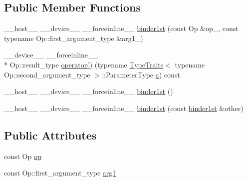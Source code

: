 \subsection*{Public Member Functions}
\begin{DoxyCompactItemize}
\item 
\-\_\-\-\_\-host\-\_\-\-\_\- \-\_\-\-\_\-device\-\_\-\-\_\- \-\_\-\-\_\-forceinline\-\_\-\-\_\- \hyperlink{structcv_1_1gpu_1_1device_1_1binder1st_a2bada5a6b0c80f382fd73dc3eeb9465f}{binder1st} (const Op \&op\-\_\-, const typename Op\-::first\-\_\-argument\-\_\-type \&arg1\-\_\-)
\item 
\-\_\-\-\_\-device\-\_\-\-\_\- \-\_\-\-\_\-forceinline\-\_\-\-\_\- \\*
Op\-::result\-\_\-type \hyperlink{structcv_1_1gpu_1_1device_1_1binder1st_ad7d3e352f53bc074a1cabd4056eb7994}{operator()} (typename \hyperlink{structcv_1_1gpu_1_1device_1_1TypeTraits}{Type\-Traits}$<$ typename Op\-::second\-\_\-argument\-\_\-type $>$\-::Parameter\-Type \hyperlink{legacy_8hpp_a1031d0e0a97a340abfe0a6ab9e831045}{a}) const 
\item 
\-\_\-\-\_\-host\-\_\-\-\_\- \-\_\-\-\_\-device\-\_\-\-\_\- \-\_\-\-\_\-forceinline\-\_\-\-\_\- \hyperlink{structcv_1_1gpu_1_1device_1_1binder1st_adf2c90ab335c7b22e03280968f33d815}{binder1st} ()
\item 
\-\_\-\-\_\-host\-\_\-\-\_\- \-\_\-\-\_\-device\-\_\-\-\_\- \-\_\-\-\_\-forceinline\-\_\-\-\_\- \hyperlink{structcv_1_1gpu_1_1device_1_1binder1st_a4ac66118e33bf2b595200b120392d4ef}{binder1st} (const \hyperlink{structcv_1_1gpu_1_1device_1_1binder1st}{binder1st} \&other)
\end{DoxyCompactItemize}
\subsection*{Public Attributes}
\begin{DoxyCompactItemize}
\item 
const Op \hyperlink{structcv_1_1gpu_1_1device_1_1binder1st_a4fd65cab8767cd0ceae2be404d208b7d}{op}
\item 
const Op\-::first\-\_\-argument\-\_\-type \hyperlink{structcv_1_1gpu_1_1device_1_1binder1st_a3655c7e6384979edd669b95bd63c0a3b}{arg1}
\end{DoxyCompactItemize}


